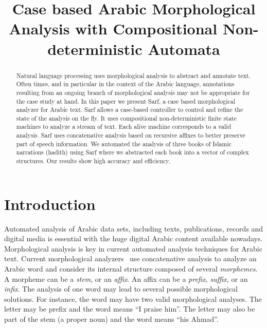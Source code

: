 \documentclass[11pt,letterpaper]{article}
\title{Case based Arabic Morphological Analysis with 
    Compositional Non-deterministic Automata }
\date{}
\begin{document}
\maketitle

\begin{abstract}
Natural language processing uses morphological 
analysis to abstract and annotate text.
Often times, and in particular in the context
of the Arabic language, annotations resulting from 
an ongoing branch of morphological analysis may not be
appropriate for the case study at hand. 
In this paper we present Sarf, a case based morphological 
analyzer for Arabic text. 
Sarf allows a case-based controller to control and refine
the state of the analysis on the fly. 
It uses compositional non-deterministic finite state machines 
to analyze a stream of text. 
Each alive machine corresponds to a valid analysis. 
Sarf uses concatenative analysis based on recursive affixes 
to better preserve part of speech information.
We automated the analysis of three books of Islamic
narrations (hadith) using Sarf where we
abstracted each book into a vector of complex structures.
Our results show high accuracy and efficiency.
\end{abstract}

\section{Introduction}

Automated analysis of Arabic data sets, including texts, 
publications, records and digital media is essential
with the huge digital Arabic content available nowadays. 
Morphological analysis is key in current automated 
analysis techniques for Arabic text. 
Current morphological analyzers~\cite{Sughaiyer:04}
use concatenative analysis
to analyze an Arabic word and
consider its internal structure composed of several
{\em morphemes}. A morpheme can be a {\em stem}, or an {\em affix}.
An affix can be a {\em prefix, suffix, } or an {\em infix}.
The analysis of one word may lead to several possible
morphological solutions.
\vocalize
For instance, the word  
may have two valid morphological analyses. 
The letter  may be prefix and the word means ``I praise him''.
The letter  may also be part of the stem 
 (a proper noun)
and the word means ``his Ahmad''.
\end{document}
